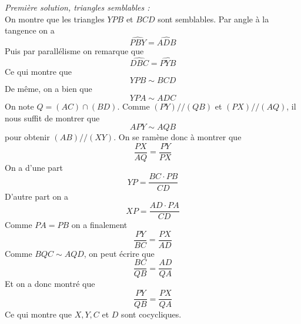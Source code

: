 \begin{sol}
\begin{center}
\end{center}

\textit{Première solution, triangles semblables :} \\
On montre que les triangles $YPB$ et $BCD$ sont semblables. Par angle à la tangence on a
$$\widehat{PBY}=\widehat{ADB} $$
Puis par parallélisme on remarque que
$$\widehat{DBC}=\widehat{PYB} $$
Ce qui montre que
$$YPB\sim BCD $$
De même, on a bien que
$$YPA\sim ADC $$
On note $Q=(AC)\cap (BD)$.
Comme $(PY)//(QB)$ et $(PX)//(AQ)$, il nous suffit de montrer que
$$APY\sim AQB $$ pour obtenir $(AB)//(XY)$. On se ramène donc à montrer que
$$\frac{PX}{AQ}=\frac{PY}{PX} $$
On a d'une part
$$YP=\frac{BC\cdot PB}{CD} $$
D'autre part on a
$$XP=\frac{AD\cdot PA}{CD}$$
Comme $PA=PB$ on a finalement
$$\frac{PY}{BC}=\frac{PX}{AD} $$
Comme $BQC\sim AQD$, on peut écrire que
$$\frac{BC}{QB}=\frac{AD}{QA} $$
Et on a donc montré que
$$\frac{PY}{QB} =\frac{PX}{QA}$$
Ce qui montre que $X,Y,C$ et $D$ sont cocycliques.


\end{sol}
